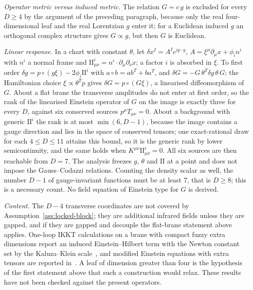 \emph{Operator metric versus induced metric.} The relation \(G=c\,g\) is excluded for every \(D\ge4\) by the argument of the preceding paragraph, because only the real four-dimensional leaf and the real Lorentzian \(g\) enter it; for a Euclidean induced \(g\) an orthogonal complex structure gives \(G\propto g\), but then \(G\) is Euclidean.

\emph{Linear response.} In a chart with constant \(\theta\), let \(\delta x^{I}=A^{I}e^{ip\cdot y}\), \(A=\xi^{\mu}\partial_\mu x+\phi_i n^{i}\) with \(n^{i}\) a normal frame and \(\mathrm{II}^{i}_{\mu\nu}=n^{i}\cdot\partial_\mu\partial_\nu x\); a factor \(i\) is absorbed in \(\xi\). To first order \(\delta g=p\circ(g\xi)-2\phi_i\mathrm{II}^{i}\) with \(a\circ b=ab^{T}+ba^{T}\), and \(\delta G=-G\,\theta^{T}\delta g\,\theta\,G\); the Hamiltonian choice \(\xi\propto\theta^{T}p\) gives \(\delta G=p\circ(G\xi)\), a linearised diffeomorphism of \(G\). About a flat brane the transverse amplitudes do not enter at first order, so the rank of the linearised Einstein operator of \(G\) on the image is exactly three for every \(D\), against six conserved sources \(p^{\mu}T_{\mu\nu}=0\). About a background with generic \(\mathrm{II}^{i}\) the rank is at most \(\min(6,D-1)\), because the image contains a gauge direction and lies in the space of conserved tensors; one exact-rational draw for each \(4\le D\le11\) attains this bound, so it is the generic rank by lower semicontinuity, and the same holds when \(K^{\mu\nu}\mathrm{II}^{i}_{\mu\nu}=0\). All six sources are then reachable from \(D=7\). The analysis freezes \(g\), \(\theta\) and \(\mathrm{II}\) at a point and does not impose the Gauss--Codazzi relations. Counting the density scalar as well, the number \(D-1\) of gauge-invariant functions must be at least \(7\), that is \(D\ge8\); this is a necessary count. No field equation of Einstein type for \(G\) is derived.

\emph{Content.} The \(D-4\) transverse coordinates are not covered by Assumption~\ref{ass:locked-block}; they are additional infrared fields unless they are gapped, and if they are gapped and decouple the flat-brane statement above applies. One-loop IKKT calculations on a brane with compact fuzzy extra dimensions report an induced Einstein--Hilbert term with the Newton constant set by the Kaluza--Klein scale~\cite{Steinacker2023}, and modified Einstein equations with extra tensors are reported in~\cite{KumarSteinacker2023,Steinacker2026}. A leaf of dimension greater than four is the hypothesis of the first statement above that such a construction would relax. These results have not been checked against the present operators.


